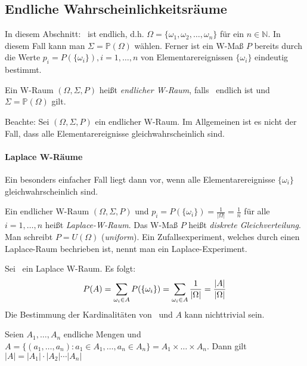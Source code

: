 \subsection{Endliche Wahrscheinlichkeitsräume}
In diesem Abschnitt: \tO\ ist endlich, d.h. $\Omega = \{\omega_1, \omega_2, \dots, \omega_n\}$
für ein $n \in \mathbb{N}$.
In diesem Fall kann man $\Sigma = \mathbb{P}(\Omega)$ wählen.
Ferner ist ein W-Maß $P$ bereits durch die Werte $p_i = P(\{\omega_i\}), i=1,\dots,n$
von Elementarereignissen $\{\omega_i\}$ eindeutig bestimmt.

\begin{definition}
    Ein W-Raum $(\Omega, \Sigma,  P)$ heißt \emph{endlicher W-Raum}, falls \tO\ endlich ist und
    $\Sigma = \mathbb{P}(\Omega)$ gilt.
\end{definition}

Beachte: Sei $(\Omega, \Sigma, P)$ ein endlicher W-Raum. Im Allgemeinen ist es nicht der Fall, dass alle
Elementarereignisse gleichwahrscheinlich sind.

\paragraph{Laplace W-Räume} Ein besonders einfacher Fall liegt dann vor, wenn alle Elementarereignisse
$\{\omega_i\}$ gleichwahrscheinlich sind.

\begin{definition}
    Ein endlicher W-Raum $(\Omega, \Sigma, P)$ und $p_i = P(\{\omega_i\}) = \frac{1}{|\Omega|} = \frac{1}{n}$
    für alle $i=1,\dots,n$ heißt \emph{Laplace-W-Raum}.
    Das W-Maß $P$ heißt \emph{diskrete Gleichverteilung}.
    Man schreibt $P=U(\Omega)$ (\textit{uniform}).
    Ein Zufallsexperiment, welches durch einen Laplace-Raum bechrieben ist, nennt man ein
    Laplace-Experiment.
\end{definition}

Sei \wraum\ ein Laplace W-Raum. Es folgt:
\begin{equation*}
    P(A) = \sum_{\omega_i \in A} P(\{\omega_i\}) = \sum_{\omega_i \in A} \frac{1}{|\Omega|} = \frac{|A|}{|\Omega|}
\end{equation*}
Die Bestimmung der Kardinalitäten von \tO\ und $A$ kann nichttrivial sein.

\begin{theorem}
    Seien $A_1, \dots ,A_n$ endliche Mengen und $A= \{ (a_1, \dots , a_n): a_1 \in A_1, \dots , a_n \in A_n \} = A_1 \times \dots \times A_n$.
    Dann gilt $|A| = |A_1| \cdot |A_2| \cdots |A_n|$
\end{theorem}
